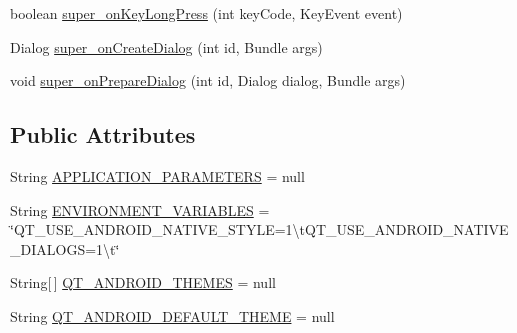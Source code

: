 \begin{DoxyCompactItemize}
\item 
boolean \hyperlink{classorg_1_1qtproject_1_1qt5_1_1android_1_1bindings_1_1_qt_activity_ad723f98cf99880c9467f96f73fa25878}{super\+\_\+on\+Key\+Long\+Press} (int key\+Code, Key\+Event event)
\item 
Dialog \hyperlink{classorg_1_1qtproject_1_1qt5_1_1android_1_1bindings_1_1_qt_activity_a814d7e98bb1c0355ed33457de6718bee}{super\+\_\+on\+Create\+Dialog} (int id, Bundle args)
\item 
void \hyperlink{classorg_1_1qtproject_1_1qt5_1_1android_1_1bindings_1_1_qt_activity_a385e763c50fd7d00213fe961bba46ed5}{super\+\_\+on\+Prepare\+Dialog} (int id, Dialog dialog, Bundle args)
\end{DoxyCompactItemize}
\subsection*{Public Attributes}
\begin{DoxyCompactItemize}
\item 
String \hyperlink{classorg_1_1qtproject_1_1qt5_1_1android_1_1bindings_1_1_qt_activity_a1c6754715d370c1e91160c534c54a7e7}{A\+P\+P\+L\+I\+C\+A\+T\+I\+O\+N\+\_\+\+P\+A\+R\+A\+M\+E\+T\+E\+R\+S} = null
\item 
String \hyperlink{classorg_1_1qtproject_1_1qt5_1_1android_1_1bindings_1_1_qt_activity_aa22d75fadcbc70bf4f5f668ea3300d6e}{E\+N\+V\+I\+R\+O\+N\+M\+E\+N\+T\+\_\+\+V\+A\+R\+I\+A\+B\+L\+E\+S} = \char`\"{}Q\+T\+\_\+\+U\+S\+E\+\_\+\+A\+N\+D\+R\+O\+I\+D\+\_\+\+N\+A\+T\+I\+V\+E\+\_\+\+S\+T\+Y\+L\+E=1\textbackslash{}t\+Q\+T\+\_\+\+U\+S\+E\+\_\+\+A\+N\+D\+R\+O\+I\+D\+\_\+\+N\+A\+T\+I\+V\+E\+\_\+\+D\+I\+A\+L\+O\+G\+S=1\textbackslash{}t\char`\"{}
\item 
String\mbox{[}$\,$\mbox{]} \hyperlink{classorg_1_1qtproject_1_1qt5_1_1android_1_1bindings_1_1_qt_activity_a0abec2a740bce96eec092bd1634d3a55}{Q\+T\+\_\+\+A\+N\+D\+R\+O\+I\+D\+\_\+\+T\+H\+E\+M\+E\+S} = null
\item 
String \hyperlink{classorg_1_1qtproject_1_1qt5_1_1android_1_1bindings_1_1_qt_activity_a74c21dffcaf3af985a164068c278b979}{Q\+T\+\_\+\+A\+N\+D\+R\+O\+I\+D\+\_\+\+D\+E\+F\+A\+U\+L\+T\+\_\+\+T\+H\+E\+M\+E} = null
\end{DoxyCompactItemize}
